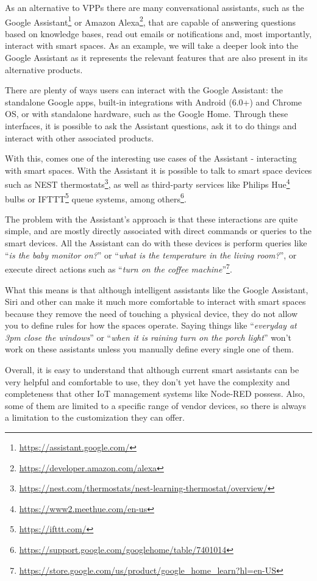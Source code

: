 \documentclass[runningheads]{llncs}
\begin{document}
As an alternative to VPPs there are many conversational assistants, such as the Google Assistant\footnote{\url{https://assistant.google.com/}} or Amazon Alexa\footnote{\url{https://developer.amazon.com/alexa}}, that are capable of answering questions based on knowledge bases, read out emails or notifications and, most importantly, interact with smart spaces. As an example, we will take a deeper look into the Google Assistant as it represents the relevant features that are also present in its alternative products.

There are plenty of ways users can interact with the Google Assistant: the standalone Google apps, built-in integrations with Android (6.0+) and Chrome OS, or with standalone hardware, such as the Google Home. Through these interfaces, it is possible to ask the Assistant questions, ask it to do things and interact with other associated products.

With this, comes one of the interesting use cases of the Assistant - interacting with smart spaces. With the Assistant it is possible to talk to smart space devices such as NEST thermostats\footnote{\url{https://nest.com/thermostats/nest-learning-thermostat/overview/}}, as well as third-party services like Philips Hue\footnote{\url{https://www2.meethue.com/en-us}} bulbs or IFTTT\footnote{\url{https://ifttt.com/}} queue systems, among others\footnote{\url{https://support.google.com/googlehome/table/7401014}}.

The problem with the Assistant’s approach is that these interactions are quite simple, and are mostly directly associated with direct commands or queries to the smart devices. All the Assistant can do with these devices is perform queries like “\textit{is the baby monitor on?}” or “\textit{what is the temperature in the living room?}”, or execute direct actions such as “\textit{turn on the coffee machine}”\footnote{\url{https://store.google.com/us/product/google\_home\_learn?hl=en-US}}.

What this means is that although intelligent assistants like the Google Assistant, Siri and other can make it much more comfortable to interact with smart spaces because they remove the need of touching a physical device, they do not allow you to define rules for how the spaces operate. Saying things like “\textit{everyday at 3pm close the windows}” or  “\textit{when it is raining turn on the porch light}” won’t work on these assistants unless you manually define every single one of them.

Overall, it is easy to understand that although current smart assistants can be very helpful and comfortable to use, they don’t yet have the complexity and completeness that other IoT management systems like Node-RED possess. Also, some of them are limited to a specific range of vendor devices, so there is always a limitation to the customization they can offer.
\end{document}
